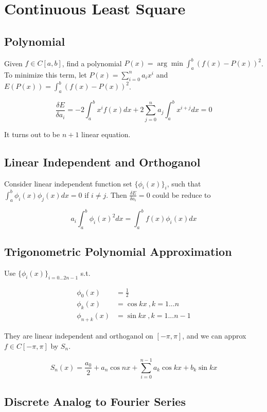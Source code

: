 \section{Continuous Least Square}

\subsection{Polynomial}

Given $f \in C[a, b]$,
find a polynomial $P(x) = \arg\min \int_a^b (f(x) - P(x))^2$.
To minimize this term, let $P(x) = \sum_{i=0}^n a_i x^i$
and $E(P(x)) = \int_a^b (f(x)-P(x))^2$.

\[
  \frac{\delta E}{\delta a_i} =
    -2 \int_a^b x^if(x) dx +
     2 \sum_{j=0}^n a_j \int_a^b x^{i+j} dx
  = 0
\]

It turns out to be $n+1$ linear equation.

\subsection{Linear Independent and Orthoganol}

Consider linear independent function set $\{\phi_i(x)\}_i$,
such that $\int_a^b \phi_i(x)\phi_j(x)dx = 0$ if $i \neq j$.
Then $\frac{\delta E}{\delta a_i} = 0$ could be reduce to

\[
  a_i \int_a^b \phi_i(x)^2dx =  \int_a^b f(x)\phi_i(x) dx
\]

\subsection{Trigonometric Polynomial Approximation}

Use $\{ \phi_i(x)\}_{i=0...2n-1}$ s.t.

\begin{align}
  \phi_0(x) &= \frac{1}{2} \nonumber \\
  \phi_k(x) &= \cos kx \ , k = 1 ... n \nonumber \\
  \phi_{n+k}(x) &= \sin kx \ , k = 1 ... n-1 \nonumber
\end{align}

They are linear independent and orthoganol on $[-\pi, \pi]$,
and we can approx $f \in C[-\pi, \pi]$ by $S_n$.

\[
  S_n(x) = \frac{a_0}{2} + a_n \cos nx + \sum_{i=0}^{n-1} a_k \cos kx + b_k \sin kx
\]

\subsection{Discrete Analog to Fourier Series}

